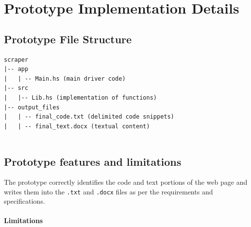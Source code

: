 \documentclass{scrreprt}
\begin{document}
\chapter{Prototype Implementation Details}

\section{Prototype File Structure}

\begin{verbatim}
scraper
|-- app
|   | -- Main.hs (main driver code)
|-- src
|   |-- Lib.hs (implementation of functions)
|-- output_files
|   | -- final_code.txt (delimited code snippets)
|   | -- final_text.docx (textual content)


\end{verbatim}







\section{Prototype features and limitations}

The prototype correctly identifies the code and text portions of the web page and writes them into the \texttt{.txt} and \texttt{.docx} files as per the requirements and specifications. 

\subsubsection{Limitations}
\end{document}

